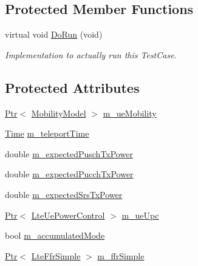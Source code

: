 \subsection*{Protected Member Functions}
\begin{DoxyCompactItemize}
\item 
virtual void \hyperlink{classLteUplinkPowerControlTestCase_ade34c47524d78d2154c15ba6c257a581}{Do\+Run} (void)
\begin{DoxyCompactList}\small\item\em Implementation to actually run this Test\+Case. \end{DoxyCompactList}\end{DoxyCompactItemize}
\subsection*{Protected Attributes}
\begin{DoxyCompactItemize}
\item 
\hyperlink{classns3_1_1Ptr}{Ptr}$<$ \hyperlink{classns3_1_1MobilityModel}{Mobility\+Model} $>$ \hyperlink{classLteUplinkPowerControlTestCase_a0b8bf35679af00783442c2e310b30e45}{m\+\_\+ue\+Mobility}
\item 
\hyperlink{classns3_1_1Time}{Time} \hyperlink{classLteUplinkPowerControlTestCase_ad2fcd44e6878fcefd595cce85c241129}{m\+\_\+teleport\+Time}
\item 
double \hyperlink{classLteUplinkPowerControlTestCase_ae21fb77822e77173714fecc9e5bc1b64}{m\+\_\+expected\+Pusch\+Tx\+Power}
\item 
double \hyperlink{classLteUplinkPowerControlTestCase_aa64bbb6e21dda8218a505dc2d907334f}{m\+\_\+expected\+Pucch\+Tx\+Power}
\item 
double \hyperlink{classLteUplinkPowerControlTestCase_ad49c44651e326c9963572e47b97ef0ed}{m\+\_\+expected\+Srs\+Tx\+Power}
\item 
\hyperlink{classns3_1_1Ptr}{Ptr}$<$ \hyperlink{classns3_1_1LteUePowerControl}{Lte\+Ue\+Power\+Control} $>$ \hyperlink{classLteUplinkPowerControlTestCase_af2fabece7259e4b60cc73d7ec02b7a3d}{m\+\_\+ue\+Upc}
\item 
bool \hyperlink{classLteUplinkPowerControlTestCase_a68142bcda5a786775546febd8aed11df}{m\+\_\+accumulated\+Mode}
\item 
\hyperlink{classns3_1_1Ptr}{Ptr}$<$ \hyperlink{classns3_1_1LteFfrSimple}{Lte\+Ffr\+Simple} $>$ \hyperlink{classLteUplinkPowerControlTestCase_ac0e14f35a6bc7b99242efc3985a87d4e}{m\+\_\+ffr\+Simple}
\end{DoxyCompactItemize}
